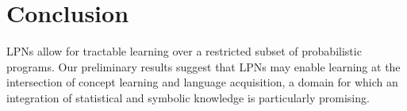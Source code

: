 \documentclass{article} %
\begin{document}
\section{Conclusion}
LPNs allow for tractable learning over a restricted subset of
probabilistic programs. Our preliminary results suggest that LPNs may
enable learning at the intersection of concept learning and language
acquisition, a domain for which an integration of statistical and
symbolic knowledge is particularly promising.



\end{document}
